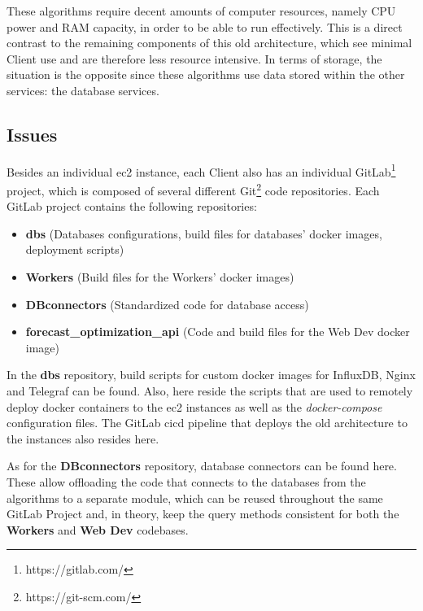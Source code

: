These algorithms require decent amounts of computer resources, namely CPU power and RAM capacity, in order to be able to run effectively. This is a direct contrast to the remaining components of this old architecture, which see minimal Client use and are therefore less resource intensive. In terms of storage, the situation is the opposite since these algorithms use data stored within the other services: the database services.

\subsection{Issues}\label{methodology:ss:Issues}


Besides an individual \gls{ec2} instance, each Client also has an individual GitLab\footnote{https://gitlab.com/}\label{foot:gitlab} project, which is composed of several different Git\footnote{https://git-scm.com/}\label{foot:git} code repositories. Each GitLab project contains the following repositories:

\begin{itemize}

    \item \textbf{dbs} (Databases configurations, build files for databases' docker images, deployment scripts)
    \item \textbf{Workers} (Build files for the Workers' docker images)
    \item \textbf{DBconnectors} (Standardized code for database access)
    \item \textbf{forecast\_optimization\_api} (Code and build files for the Web Dev docker image)
    
\end{itemize}

In the \textbf{dbs} repository, build scripts for custom docker images for InfluxDB, Nginx and Telegraf can be found. Also, here reside the scripts that are used to remotely deploy docker containers to the \gls{ec2} instances as well as the \textit{docker-compose} configuration files. The GitLab \gls{cicd} pipeline that deploys the old architecture to the instances also resides here.

As for the \textbf{DBconnectors} repository, database connectors can be found here. These allow offloading the code that connects to the databases from the algorithms to a separate module, which can be reused throughout the same GitLab Project and, in theory, keep the query methods consistent for both the \textbf{Workers} and \textbf{Web Dev} codebases.

